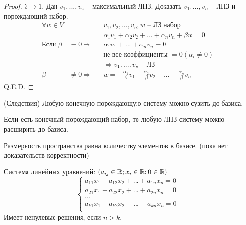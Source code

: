 \begin{proof}
    $3 \to 1$. Дан $v_1, ..., v_n$ -- максимальный ЛНЗ.
    Доказать $v_1, ..., v_n$ -- ЛНЗ и порождающий набор.
    \begin{align*}
        \forall w \in V  &                 &  & v_1, v_2, ..., v_n, w \text{ -- ЛЗ набор} \\
                           &                 &  & \alpha_1 v_1 + \alpha_2 v_2 + ...
        + \alpha_n v_n +\beta w = 0                                                           \\
        \text{Если } \beta & = 0 \Rightarrow    &  & \alpha_1 v_1 + ... + \alpha_n v_n =0        \\
                           &                 &  & \text{не все коэффициенты } = 0 (\alpha_i \neq 0) \\
                           &                 &  & \Rightarrow v_1,..., v_n \text{ -- ЛЗ}           \\
        \beta              & \neq 0 \Rightarrow &  & w = - \frac{\alpha_1}{\beta} v_1
        - \frac{\alpha_2}{\beta} v_2 - ...  - \frac{\alpha_n}{\beta} v_n
    \end{align*} Q.E.D.
\end{proof}

\begin{remark} (Следствия)
    Любую конечную порождающую систему можно сузить до базиса.

    Если есть конечный порождающий набор, то любую ЛНЗ систему можно расширить
    до базиса.
\end{remark}

\begin{definition}
    Размерность пространства равна количеству элементов в базисе.
    (пока нет доказательств корректности)
\end{definition}

\begin{lemma}
    Система линейных уравнений: $(a_{ij} \in \mathbb{R}; x_i \in \mathbb{R}; 0 \in \mathbb{R})$
    \begin{equation*}
        \begin{cases}
            a_{11} x_1 + a_{12}x_2 + ... + a_{1n} x_n = 0 \\
            a_{21} x_1 + a_{22}x_2 + ... + a_{2n} x_n = 0 \\
            ...                                           \\
            a_{k1} x_1 + a_{k2}x_2 + ... + a_{kn} x_n = 0 \\
        \end{cases}
    \end{equation*}
    Имеет ненулевые решения, если $n>k$.
\end{lemma}

